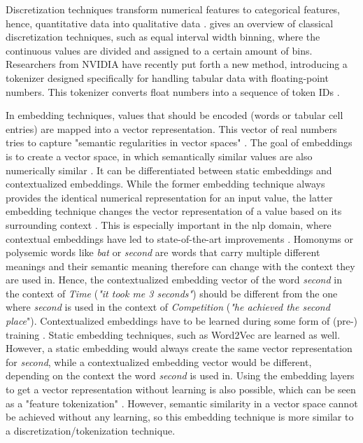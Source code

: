 Discretization techniques transform numerical features to categorical features, hence, quantitative data into qualitative data \cite{garcia2016BigDataPreprocessing}. 
\cite{dougherty1995SupervisedUnsupervisedDiscretization} gives an overview of classical discretization techniques, such as equal interval width binning, where the continuous values are divided and assigned to a certain amount of bins.
Researchers from NVIDIA \cite{dong2022GeneratingSyntheticData} have recently put forth a new method, introducing a tokenizer designed specifically for handling tabular data with floating-point numbers.
This tokenizer converts float numbers into a sequence of token IDs \cite{dong2022GeneratingSyntheticData}.

In embedding techniques, values that should be encoded (\eg words or tabular cell entries) are mapped into a vector representation. 
This vector of real numbers tries to capture "semantic regularities in vector spaces" \cite[p. 2]{pilaluisa2022ContextualWordEmbeddings}.
The goal of embeddings is to create a vector space, in which semantically similar values are also numerically similar \cite{pilaluisa2022ContextualWordEmbeddings}.
It can be differentiated between static embeddings and contextualized embeddings. 
While the former embedding technique always provides the identical numerical representation for an input value, the latter embedding technique changes the vector representation of a value based on its surrounding context \cite{pilaluisa2022ContextualWordEmbeddings}.
This is especially important in the \gls{nlp} domain, where contextual embeddings have led to state-of-the-art improvements \cite{pilaluisa2022ContextualWordEmbeddings}.
Homonyms or polysemic words like \textit{bat} or \textit{second} are words that carry multiple different meanings and their semantic meaning therefore can change with the context they are used in.
Hence, the contextualized embedding vector of the word \textit{second} in the context of \textit{Time} (\eg \textit{"it took me 3 seconds"}) should be different from the one where \textit{second} is used in the context of \textit{Competition} (\eg \textit{"he achieved the second place}").
Contextualized embeddings have to be learned during some form of (pre-) training \cite{devlin2019BERTPretrainingDeep, iida2021TABBIEPretrainedRepresentations, deng2021TURLTableUnderstanding}. 
Static embedding techniques, such as Word2Vec \cite{mikolov2013DistributedRepresentationsWords} are learned as well.
However, a static embedding would always create the same vector representation for \textit{second}, while a contextualized embedding vector would be different, depending on the context the word \textit{second} is used in.
Using the embedding layers to get a vector representation without learning is also possible, which can be seen as a "feature tokenization" \cite{zheng2022DiffusionModelsMissing, gorishniy2021RevisitingDeepLearning}.
However, semantic similarity in a vector space cannot be achieved without any learning, so this embedding technique is more similar to a discretization/tokenization technique.


